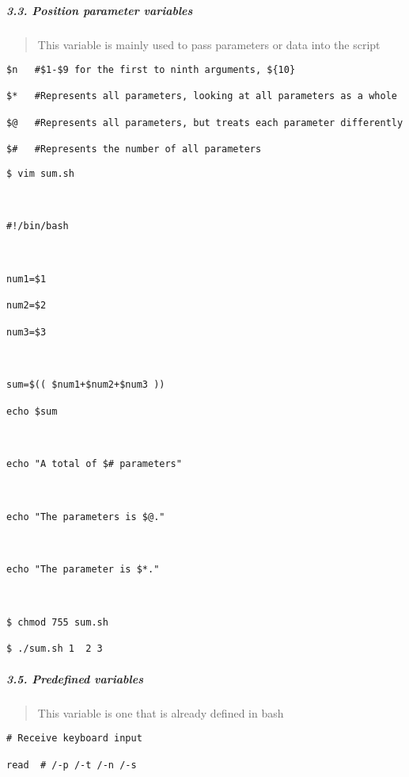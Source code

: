 \documentclass[
]{article}
\begin{document}
\hypertarget{header-n333}{%
\subparagraph{3.3. Position parameter variables}\label{header-n333}}

\begin{quote}
This variable is mainly used to pass parameters or data into the script
\end{quote}

\begin{verbatim}
$n   #$1-$9 for the first to ninth arguments, ${10}

$*   #Represents all parameters, looking at all parameters as a whole

$@   #Represents all parameters, but treats each parameter differently

$#   #Represents the number of all parameters
\end{verbatim}

\begin{verbatim}
$ vim sum.sh



#!/bin/bash



num1=$1

num2=$2

num3=$3



sum=$(( $num1+$num2+$num3 ))

echo $sum



echo "A total of $# parameters"



echo "The parameters is $@."



echo "The parameter is $*."



$ chmod 755 sum.sh

$ ./sum.sh 1  2 3
\end{verbatim}

\hypertarget{header-n273}{%
\subparagraph{3.5. Predefined variables}\label{header-n273}}

\begin{quote}
This variable is one that is already defined in bash
\end{quote}

\begin{verbatim}
# Receive keyboard input

read  # /-p /-t /-n /-s
\end{verbatim}
\end{document}
